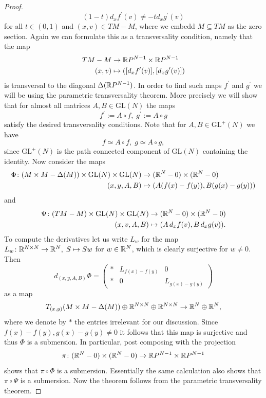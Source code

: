 \begin{proof}
    \[
    (1-t) d_xf^\prime (v) \neq -t d_xg^\prime (v)
    \]
    for all $t \in (0,1)$ and $(x,v) \in TM - M$, where we embedd $M \subseteq TM$ as the zero section. Again we can formulate this as a transversality condition, namely that the map 
   \begin{align*}
    TM -M & \to \mathbb{R} P^{N-1} \times \mathbb{R} P^{N-1} \\
    (x,v) &\mapsto ([d_xf^\prime (v)], [d_xg^\prime (v)])
    \end{align*}
    is transversal to the diagonal $\Delta(\mathbb{R} P^{N-1})$. In order to find such maps $f^\prime$ and $g^\prime$ we will be using the parametric transversality theorem. More precisely we will show that for almost all matrices $A,B \in \mathrm{GL}(N)$ the maps 
    \[
    f^\prime := A \circ f, \; g^\prime := A \circ g
    \]
    satisfy the desired transversality conditions. Note that for $A, B \in \mathrm{GL}^+(N)$ we have 
    \[
    f \simeq A \circ f, \; g \simeq A \circ g,
    \]
    since $\mathrm{GL}^+(N)$ is the path connected component of $\mathrm{GL}(N)$ containing the identity. Now consider the maps 
    \begin{align*}
        \Phi \colon (M \times M - \Delta(M)) \times \mathrm{GL}(N) \times \mathrm{GL}(N) &\to (\mathbb{R}^N - 0) \times (\mathbb{R}^N - 0)\\
        (x,y,A,B) &\mapsto (A (f(x)- f(y)),B(g(x) - g(y)))
    \end{align*}
    and 
    \begin{align*}
        \Psi \colon (TM - M) \times \mathrm{GL}(N) \times \mathrm{GL}(N) &\to (\mathbb{R}^N - 0) \times (\mathbb{R}^N - 0)\\
        (x,v,A,B) &\mapsto (A \, d_xf(v),B\, d_xg(v)).
    \end{align*}
    To compute the derivatives let us write $L_w$ for the map $L_w \colon \mathbb{R}^{N \times N} \to \mathbb{R}^N, \; S \mapsto Sw$ for $w \in \mathbb{R}^N$, which is clearly surjective for $w \neq 0$. Then 
    \[
    d_{(x,y,A,B)} \Phi = \begin{pmatrix}
        \ast & L_{f(x)-f(y)} & 0 \\
        \ast & 0 & L_{g(x)-g(y)}
    \end{pmatrix}
    \]
    as a map $$T_{(x,y)} (M \times M - \Delta(M)) \oplus \mathbb{R}^{N \times N} \oplus \mathbb{R}^{N \times N} \to \mathbb{R}^N \oplus \mathbb{R}^N,$$ where we denote by $\ast$ the entries irrelevant for our discussion. Since $f(x)-f(y), g(x)-g(y) \neq 0$ it follows that this map is surjective and thus $\Phi$ is a submersion. In particular, post composing with the projection
    \[
    \pi \colon (\mathbb{R}^N - 0) \times (\mathbb{R}^N - 0) \to \mathbb{R} P^{N-1} \times \mathbb{R} P^{N-1}
    \]
    shows that $\pi \circ \Phi$ is a submersion. Essentially the same calculation also shows that $\pi \circ \Psi$ is a submersion. Now the theorem follows from the parametric transversality theorem.
\end{proof}

